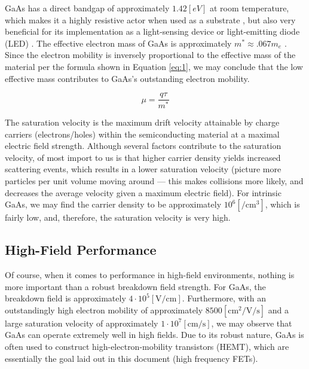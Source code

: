 \documentclass[conference]{IEEEtran}
\begin{document}
GaAs has a direct bandgap of approximately $1.42[\si{eV}]$ at room temperature, which makes it a highly resistive actor when used as a substrate \cite[Page 470]{textbook}, but also very beneficial for its implementation as a light-sensing device or light-emitting diode (LED) \cite[Page 449]{textbook}. The effective electron mass of GaAs is approximately $m^*\approx.067m_e$ \cite[Page 424]{textbook}. Since the electron mobility is inversely proportional to the effective mass of the material per the formula shown in Equation \ref{eq:1}, we may conclude that the low effective mass contributes to GaAs's outstanding electron mobility.

\begin{equation}
  \mu=\frac{q\tau}{m^*}
  \label{eq:1}
\end{equation}

The saturation velocity is the maximum drift velocity attainable by charge carriers (electrons/holes) within the semiconducting material at a maximal electric field strength. Although several factors contribute to the saturation velocity, of most import to us is that higher carrier density yields increased scattering events, which results in a lower saturation velocity (picture more particles per unit volume moving around — this makes collisions more likely, and decreases the average velocity given a maximum electric field). For intrinsic GaAs, we may find the carrier density to be approximately $10^6[\si{\per\centi\meter\cubed}]$, which is fairly low, and, therefore, the saturation velocity is very high. 

\subsection{High-Field Performance}

Of course, when it comes to performance in high-field environments, nothing is more important than a robust breakdown field strength. For GaAs, the breakdown field is approximately $4\cdot10^{5}[\si{\volt\per\centi\meter}]$. Furthermore, with an outstandingly high electron mobility of approximately $8500[\si{\centi\meter\squared\per\volt\per\second}]$ and a large saturation velocity of approximately $1\cdot10^7[\si{\centi\meter\per\second}]$, we may observe that GaAs can operate extremely well in high fields. Due to its robust nature, GaAs is often used to construct high-electron-mobility transistors (HEMT), which are essentially the goal laid out in this document (high frequency FETs).
\end{document}
